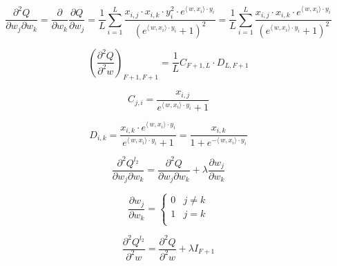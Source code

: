 \documentclass[12pt]{article}
\begin{document}
$$\frac{\partial^2 Q}{\partial w_j \partial w_k} = \frac{\partial}{\partial w_k} \frac{\partial Q}{\partial w_j} = \frac{1}{L}\sum\limits_{i = 1}^{L} \frac{x_{i, j} \cdot x_{i, k} \cdot y_i^2 \cdot e^{\langle\,w,x_i\rangle \cdot y_i}}{(e^{\langle\,w,x_i\rangle \cdot y_i} + 1)^2} = \frac{1}{L}\sum\limits_{i = 1}^{L} \frac{x_{i, j} \cdot x_{i, k} \cdot e^{\langle\,w,x_i\rangle \cdot y_i}}{(e^{\langle\,w,x_i\rangle \cdot y_i} + 1)^2}$$

\[ 
\left( \frac{\partial^2 Q}{\partial^2 w} \right)_{F+1, F+1} =\frac{1}{L} C_{F+1, L} \cdot D_{L, F+1}
\]

$$C_{j, i} = \frac{x_{i, j}}{e^{\langle\,w,x_i\rangle \cdot y_i} + 1}$$

$$D_{i, k} = \frac{x_{i, k} \cdot e^{\langle\,w,x_i\rangle \cdot y_i}}{e^{\langle\,w,x_i\rangle \cdot y_i} + 1} = \frac{x_{i, k} }{1 + e^{-\langle\,w,x_i\rangle \cdot y_i} } $$

$$\frac{\partial^2 Q^{l_2}}{\partial w_j \partial w_k} = \frac{\partial^2 Q}{\partial w_j \partial w_k} + \lambda \frac{\partial w_j}{\partial w_k}$$

\[\frac{\partial w_j}{\partial w_k} = \begin{cases} 
      0 & j \neq k\\
     1 & j = k \\
   \end{cases}
\]


$$\frac{\partial^2 Q^{l_2}}{\partial^2 w} = \frac{\partial^2 Q}{\partial^2 w} + \lambda I_{F+1}$$
\end{document}
